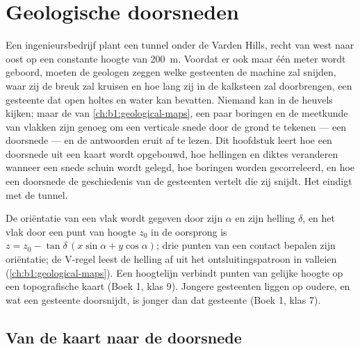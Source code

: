 \chapter{Geologische doorsneden}\label{ch:b1:cross-sections}

Een ingenieursbedrijf plant een tunnel onder de Varden Hills, recht van west naar oost op een
constante hoogte van \qty{200}{m}. Voordat er ook maar één meter wordt geboord, moeten de geologen
zeggen welke gesteenten de machine zal snijden, waar zij de breuk zal kruisen en hoe lang zij in de
kalksteen zal doorbrengen, een gesteente dat open holtes en water kan bevatten. Niemand kan in de
heuvels kijken; maar de  van \cref{ch:b1:geological-maps}, een paar boringen en de
meetkunde van vlakken zijn genoeg om een verticale snede door de grond te tekenen --- een
doorsnede --- en de antwoorden eruit af te lezen. Dit hoofdstuk leert hoe een doorsnede uit een kaart
wordt opgebouwd, hoe hellingen en diktes veranderen wanneer een snede schuin wordt gelegd, hoe boringen
worden gecorreleerd, en hoe een doorsnede de geschiedenis van de gesteenten vertelt die zij snijdt. Het
eindigt met de tunnel.

\begin{recall}
De oriëntatie van een vlak wordt gegeven door zijn  $\alpha$ en zijn helling
$\delta$, en het vlak door een punt van hoogte $z_0$ in de oorsprong is
$z = z_0 - \tan\delta\,(x\sin\alpha + y\cos\alpha)$; drie punten van een contact bepalen zijn
oriëntatie; de V-regel leest de helling af uit het ontsluitingspatroon in valleien
(\cref{ch:b1:geological-maps}). Een hoogtelijn verbindt punten van gelijke hoogte op een
topografische kaart (Boek 1, klas 9). Jongere gesteenten liggen op oudere, en wat een gesteente
doorsnijdt, is jonger dan dat gesteente (Boek 1, klas 7).
\end{recall}

\section{Van de kaart naar de doorsnede}

